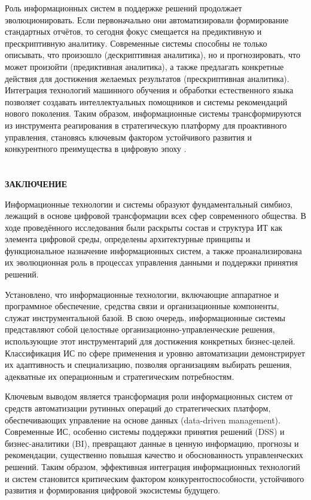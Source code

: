 \documentclass{SibFU-docs}
\begin{document}

Роль информационных систем в поддержке решений продолжает эволюционировать. Если первоначально они автоматизировали формирование стандартных отчётов, то сегодня фокус смещается на предиктивную и прескриптивную аналитику. Современные системы способны не только описывать, что произошло (дескриптивная аналитика), но и прогнозировать, что может произойти (предиктивная аналитика), а также предлагать конкретные действия для достижения желаемых результатов (прескриптивная аналитика). Интеграция технологий машинного обучения и обработки естественного языка позволяет создавать интеллектуальных помощников и системы рекомендаций нового поколения. Таким образом, информационные системы трансформируются из инструмента реагирования в стратегическую платформу для проактивного управления, становясь ключевым фактором устойчивого развития и конкурентного преимущества в цифровую эпоху \cite{data_driven}.

\newpage
\section*{}
\vspace*{-2.5em}
\begin{center}\textbf{ЗАКЛЮЧЕНИЕ}\end{center}
{}

Информационные технологии и системы образуют фундаментальный симбиоз, лежащий в основе цифровой трансформации всех сфер современного общества. В ходе проведённого исследования были раскрыты состав и структура ИТ как элемента цифровой среды, определены архитектурные принципы и функциональное назначение информационных систем, а также проанализирована их эволюционная роль в процессах управления данными и поддержки принятия решений.

Установлено, что информационные технологии, включающие аппаратное и программное обеспечение, средства связи и организационные компоненты, служат инструментальной базой. В свою очередь, информационные системы представляют собой целостные организационно-управленческие решения, использующие этот инструментарий для достижения конкретных бизнес-целей. Классификация ИС по сфере применения и уровню автоматизации демонстрирует их адаптивность и специализацию, позволяя организациям выбирать решения, адекватные их операционным и стратегическим потребностям.

Ключевым выводом является трансформация роли информационных систем от средств автоматизации рутинных операций до стратегических платформ, обеспечивающих управление на основе данных (data-driven management). Современные ИС, особенно системы поддержки принятия решений (DSS) и бизнес-аналитики (BI), превращают данные в ценную информацию, прогнозы и рекомендации, существенно повышая качество и обоснованность управленческих решений. Таким образом, эффективная интеграция информационных технологий и систем становится критическим фактором конкурентоспособности, устойчивого развития и формирования цифровой экосистемы будущего.
\end{document}
